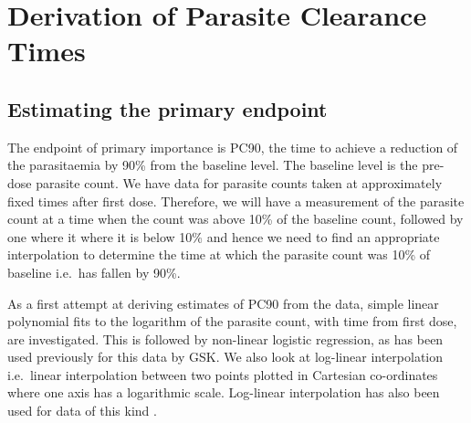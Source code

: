 \chapter{Derivation of Parasite Clearance Times}\label{ch:derivation}
\section{Estimating the primary endpoint}
The endpoint of primary importance is PC90, the time to achieve a reduction of the parasitaemia by 90\% from the baseline level. The baseline level is the pre-dose parasite count. We have data for parasite counts taken at approximately fixed times after first dose. Therefore, we will have a measurement of the parasite count at a time when the count was above 10\% of the baseline count, followed by one where it where it is below 10\% and hence we need to find an appropriate interpolation to determine the time at which the parasite count was 10\% of baseline i.e.\ has fallen by 90\%.

As a first attempt at deriving estimates of PC90 from the data, simple linear polynomial fits to the logarithm of the parasite count, with time from first dose, are investigated. This is followed by non-linear logistic regression, as has been used previously for this data by GSK. We also look at log-linear interpolation i.e.\ linear interpolation between two points plotted in Cartesian co-ordinates where one axis has a logarithmic scale. Log-linear interpolation has also been used for data of this kind \cite{newton, carmello}.

